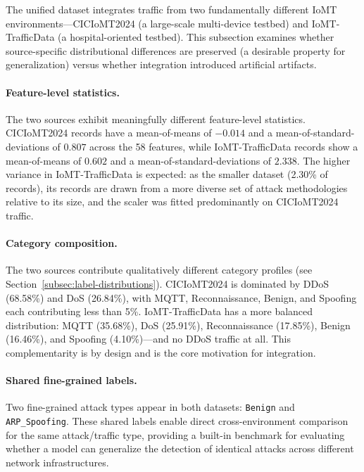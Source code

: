 The unified dataset integrates traffic from two fundamentally different IoMT environments---CICIoMT2024 (a large-scale multi-device testbed) and IoMT-TrafficData (a hospital-oriented testbed). This subsection examines whether source-specific distributional differences are preserved (a desirable property for generalization) versus whether integration introduced artificial artifacts.

\paragraph{Feature-level statistics.}
The two sources exhibit meaningfully different feature-level statistics. CICIoMT2024 records have a mean-of-means of $-0.014$ and a mean-of-standard-deviations of $0.807$ across the 58 features, while IoMT-TrafficData records show a mean-of-means of $0.602$ and a mean-of-standard-deviations of $2.338$. The higher variance in IoMT-TrafficData is expected: as the smaller dataset (2.30\% of records), its records are drawn from a more diverse set of attack methodologies relative to its size, and the scaler was fitted predominantly on CICIoMT2024 traffic.

\paragraph{Category composition.}
The two sources contribute qualitatively different category profiles (see Section~\ref{subsec:label-distributions}). CICIoMT2024 is dominated by DDoS (68.58\%) and DoS (26.84\%), with MQTT, Reconnaissance, Benign, and Spoofing each contributing less than 5\%. IoMT-TrafficData has a more balanced distribution: MQTT (35.68\%), DoS (25.91\%), Reconnaissance (17.85\%), Benign (16.46\%), and Spoofing (4.10\%)---and no DDoS traffic at all. This complementarity is by design and is the core motivation for integration.

\paragraph{Shared fine-grained labels.}
Two fine-grained attack types appear in both datasets: \texttt{Benign} and \texttt{ARP\_Spoofing}. These shared labels enable direct cross-environment comparison for the same attack/traffic type, providing a built-in benchmark for evaluating whether a model can generalize the detection of identical attacks across different network infrastructures.

